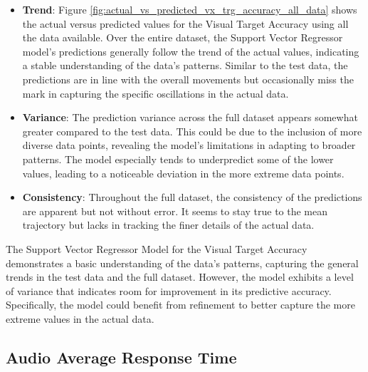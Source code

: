 \begin{itemize}
    \item \textbf{Trend}: Figure \ref{fig:actual_vs_predicted_vx_trg_accuracy_all_data} shows the actual versus predicted values for the Visual Target Accuracy using all the data available. Over the entire dataset,
          the Support Vector Regressor model's predictions generally follow the trend of the actual values, indicating a stable understanding of the data's patterns. Similar to the test data, the predictions are in line with the
          overall movements but occasionally miss the mark in capturing the specific oscillations in the actual data.

    \item \textbf{Variance}: The prediction variance across the full dataset appears somewhat greater compared to the test data. This could be due to the inclusion of more diverse data points, revealing the model's
          limitations in adapting to broader patterns. The model especially tends to underpredict some of the lower values, leading to a noticeable deviation in the more extreme data points.

    \item \textbf{Consistency}: Throughout the full dataset, the consistency of the predictions are apparent but not without error. It seems to stay true to the mean trajectory but lacks in tracking the
          finer details of the actual data.

\end{itemize}

The Support Vector Regressor Model for the Visual Target Accuracy demonstrates a basic understanding of the data's patterns, capturing the general trends in the test data and the full dataset. However, the model exhibits
a level of variance that indicates room for improvement in its predictive accuracy. Specifically, the model could benefit from refinement to better capture the more extreme values in the actual data.

\subsection*{Audio Average Response Time}

